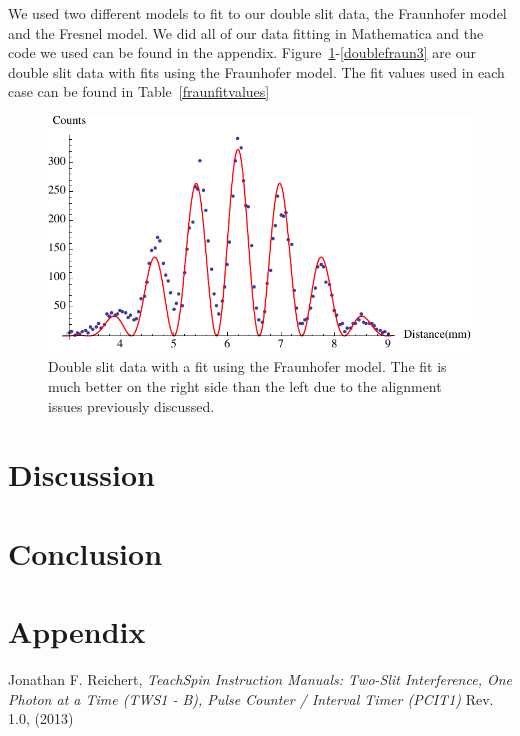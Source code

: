 \documentclass[prb,preprint]{revtex4-1}
\begin{document}
We used two different models to fit to our double slit data, the Fraunhofer model and the Fresnel model. We did all of our data fitting in Mathematica and the code we used can be found in the appendix. Figure~\ref{doublefraun1}-\ref{doublefraun3} are our double slit data with fits using the Fraunhofer model. The fit values used in each case can be found in Table~\ref{fraunfitvalues} 

\begin{figure}[h!]
\centering
\includegraphics[width=6in]{doublefraun1.pdf}
\caption{Double slit data with a fit using the Fraunhofer model. The fit is much better on the right side than the left due to the alignment issues previously discussed.}
\label{doublefraun1}
\end{figure}


\section{Discussion}


\section{Conclusion}

\section{Appendix}

\begin{thebibliography}{1}

 Jonathan F. Reichert, \textit{TeachSpin Instruction Manuals: Two-Slit Interference, One Photon at a Time (TWS1 - B), Pulse Counter / Interval Timer (PCIT1)} Rev. 1.0, (2013)

\end{thebibliography}
\end{document}
